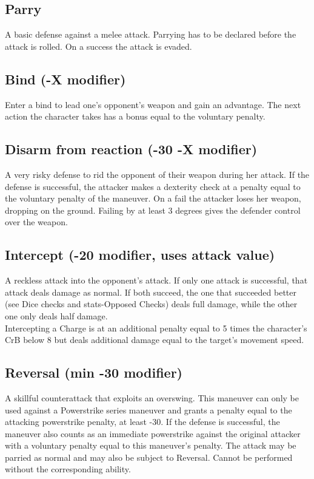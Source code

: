 \documentclass[12pt,a4paper,openany]{book}
\begin{document}
	\subsection*{Parry}
	A basic defense against a melee attack. Parrying has to be declared before the attack is rolled. On a success the attack is evaded.
	\subsection*{Bind (-X modifier)}
	Enter a bind to lead one’s opponent’s weapon and gain an advantage. The next action the character takes has a bonus equal to the voluntary penalty.
	\subsection*{Disarm from reaction (-30 -X modifier)}
	A very risky defense to rid the opponent of their weapon during her attack. If the defense is successful, the attacker makes a dexterity check at a penalty equal to the voluntary penalty of the maneuver. On a fail the attacker loses her weapon, dropping on the ground. Failing by at least 3 degrees gives the defender control over the weapon.
	\subsection*{Intercept (-20 modifier, uses attack value)}
	A reckless attack into the opponent's attack. If only one attack is successful, that attack deals damage as normal. If both succeed, the one that succeeded better (see Dice checks and stats-Opposed Checks) deals full damage, while the other one only deals half damage.\\
	Intercepting a Charge is at an additional penalty equal to 5 times the character’s CrB below 8 but deals additional damage equal to the target’s movement speed.
	\subsection*{Reversal (min -30 modifier)}
	A skillful counterattack that exploits an overswing. This maneuver can only be used against a Powerstrike series maneuver and grants a penalty equal to the attacking powerstrike penalty, at least -30. If the defense is successful, the maneuver also counts as an immediate powerstrike against the original attacker with a voluntary penalty equal to this maneuver’s penalty. The attack may be parried as normal and may also be subject to Reversal. Cannot be performed without the corresponding ability.
\end{document}
